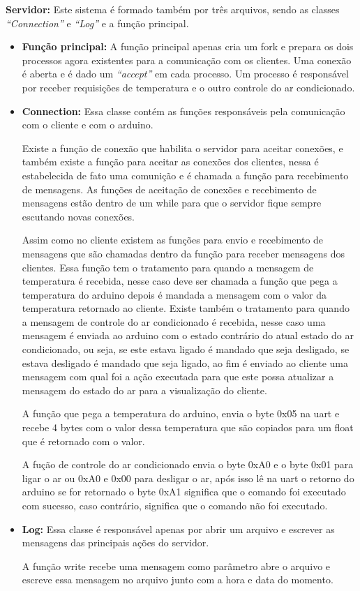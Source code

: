 \documentclass[journal,transmag]{IEEEtran}
\begin{document}
\textbf{Servidor:}
Este sistema é formado também por três arquivos, sendo as classes \textit{``Connection''} e \textit{``Log''} e a função principal.

\begin{itemize}
	\item \textbf{Função principal:}
		A função principal apenas cria um fork e prepara os dois processos agora existentes para a comunicação com os clientes. Uma conexão é aberta e é dado um \textit{``accept''} em cada processo. Um processo é responsável por receber requisições de temperatura e o outro controle do ar condicionado.
	\item \textbf{Connection:}
		Essa classe contém as funções responsáveis pela comunicação com o cliente e com o arduino.

		Existe a função de conexão que habilita o servidor para aceitar conexões, e também existe a função para aceitar as conexões dos clientes, nessa é estabelecida de fato uma comunição e é chamada a função para recebimento de mensagens. As funções de aceitação de conexões e recebimento de mensagens estão dentro de um while para que o servidor fique sempre escutando novas conexões.

		Assim como no cliente existem as funções para envio e recebimento de mensagens que são chamadas dentro da função para receber mensagens dos clientes. Essa função tem o tratamento para quando a mensagem de temperatura é recebida, nesse caso deve ser chamada a função que pega a temperatura do arduino depois é mandada a mensagem com o valor da temperatura retornado ao cliente. Existe também o tratamento para quando a mensagem de controle do ar condicionado é recebida, nesse caso uma mensagem é enviada ao arduino com o estado contrário do atual estado do ar condicionado, ou seja, se este estava ligado é mandado que seja desligado, se estava desligado é mandado que seja ligado, ao fim é enviado ao cliente uma mensagem com qual foi a ação executada para que este possa atualizar a mensagem do estado do ar para a visualização do cliente.

		A função que pega a temperatura do arduino, envia o byte 0x05 na uart e recebe 4 bytes com o valor dessa temperatura que são copiados para um float que é retornado com o valor.

		A fução de controle do ar condicionado envia o byte 0xA0 e o byte 0x01 para ligar o ar ou 0xA0 e 0x00 para desligar o ar, após isso lê na uart o retorno do arduino se for retornado o byte 0xA1 significa que o comando foi executado com sucesso, caso contrário, significa que o comando não foi executado.
	\item \textbf{Log:}
		Essa classe é responsável apenas por abrir um arquivo e escrever as mensagens das principais ações do servidor.

		A função write recebe uma mensagem como parâmetro abre o arquivo e escreve essa mensagem no arquivo junto com a hora e data do momento.
\end{itemize}
\end{document}
